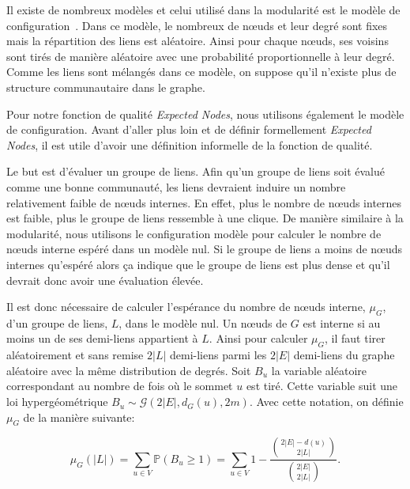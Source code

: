 Il existe de nombreux modèles et celui utilisé dans la modularité est le modèle de configuration~\cite{Bender1978a}.
Dans ce modèle, le nombreux de n\oe uds et leur degré sont fixes mais la répartition des liens est aléatoire.
Ainsi pour chaque n\oe uds, ses voisins sont tirés de manière aléatoire avec une probabilité proportionnelle à leur degré.
Comme les liens sont mélangés dans ce modèle, on suppose qu'il n'existe plus de structure communautaire dans le graphe.

Pour notre fonction de qualité \emph{Expected Nodes}, nous utilisons également le modèle de configuration.
Avant d'aller plus loin et de définir formellement \emph{Expected Nodes}, il est utile d'avoir une définition informelle de la fonction de qualité.

Le but est d'évaluer un groupe de liens.
Afin qu'un groupe de liens soit évalué comme une bonne communauté, les liens devraient induire un nombre relativement faible de n\oe uds internes.
En effet, plus le nombre de n\oe uds internes est faible, plus le groupe de liens ressemble à une clique.
De manière similaire à la modularité, nous utilisons le configuration modèle pour calculer le nombre de n\oe uds interne espéré dans un modèle nul.
Si le groupe de liens a moins de n\oe uds internes qu'espéré alors ça indique que le groupe de liens est plus dense et qu'il devrait donc avoir une évaluation élevée.

Il est donc nécessaire de calculer l'espérance du nombre de n\oe uds interne, $\mu_{G}$, d'un groupe de liens, $L$, dans le modèle nul.
Un n\oe uds de $G$ est interne si au moins un de ses  demi-liens appartient à $L$.
Ainsi pour calculer $\mu_{G}$, il faut tirer aléatoirement et sans remise $2|L|$ demi-liens parmi les $2|E|$ demi-liens du  graphe aléatoire avec la m\^eme distribution de degrés.
Soit $B_u$ la variable aléatoire correspondant au nombre de fois où le sommet $u$ est tiré.
Cette variable suit une loi  hypergéométrique $B_u \sim \mathcal{G}\left(2|E|,d_G(u),2m\right)$.
Avec cette notation, on définie $\mu_G$ de la manière suivante:

\begin{equation}
\label{eq:nbsommet_esp} \mu_{G}(|L|) = \sum_{u\in V} \mathbb{P}( B_u \geq 1 )
=  \sum_{u \in V} 1 - \dfrac{ \binom{2|E|-d(u)}{2|L|} }{ \binom{2|E|}{2|L|} }. 
\end{equation}

